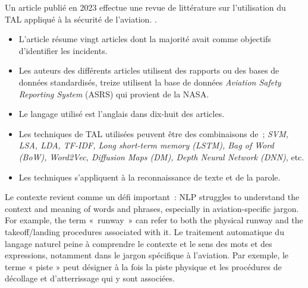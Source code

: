 {Un article publié en 2023 effectue une revue de littérature sur l'utilisation du TAL appliqué à la sécurité de l'aviation. \cite{yang_natural_2023}.  
\begin{itemize}
    \item L'article résume vingt articles dont la majorité avait comme objectifs d'identifier les incidents.
    \item Les auteurs des différents articles utilisent des rapports ou des bases de données standardisés, treize utilisent la base de données \textit{Aviation Safety Reporting System} (ASRS) qui provient de la NASA.
    \item Le langage utilisé est l'anglais dans dix-huit des articles.
    \item Les techniques de TAL utilisées peuvent être des combinaisons de~; \textit{SVM, LSA, LDA, TF-IDF, Long short-term memory (LSTM), Bag of Word (BoW), Word2Vec, Diffusion Maps (DM), Depth Neural Network (DNN)}, etc.
    \item Les techniques s'appliquent à la reconnaissance de texte et de la parole.
\end{itemize}
Le contexte revient comme un défi important~: 
\quoteenfr
{NLP struggles to understand the context and meaning of words and phrases, especially in aviation-specific jargon. For example, the term «~runway~» can refer to both the physical runway and the takeoff/landing procedures associated with it. \cite{yang_natural_2023}
}
{Le traitement automatique du langage naturel peine à comprendre le contexte et le sens des mots et des expressions, notamment dans le jargon spécifique à l'aviation. Par exemple, le terme « piste » peut désigner à la fois la piste physique et les procédures de décollage et d'atterrissage qui y sont associées.}

}

